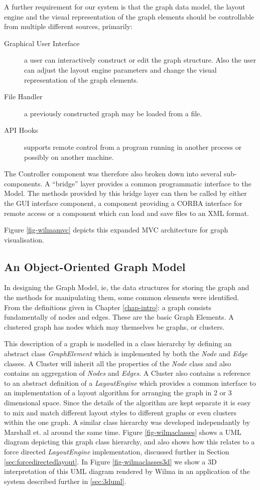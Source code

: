 \documentclass[runningheads]{cl2emult}
\begin{document}
A further requirement for our system is that the graph data model,
the layout engine and the visual representation of the graph elements should be controllable from multiple different sources, primarily:
\begin{description}
\item[Graphical User Interface] a user can interactively construct or edit the graph structure.  Also the user can adjust the layout engine parameters and change the visual representation of the graph elements.
\item[File Handler] a previously constructed graph may be loaded from a file.
\item[API Hooks] supports remote control from a program running in another process or possibly on
another machine. 
\end{description}
The Controller component was therefore also broken
down into several sub-components.  A ``bridge'' layer provides a common
programmatic interface to the Model.  The methods provided by this
bridge layer can then be called by either the GUI interface component,
a component providing a CORBA interface for remote access or a component which
can load and save files to an XML format.

Figure \ref{fig-wilmamvc} depicts this expanded MVC architecture for graph
visualisation. 

\subsection{An Object-Oriented Graph Model}
In designing the Graph Model, ie, the data structures for storing the
graph and the methods for manipulating them, some common
elements were identified.  From the definitions given in Chapter 
\ref{chap-intro}: a graph consists fundamentally
of nodes and edges.  These are the basic Graph Elements.  A clustered
graph has nodes which may themselves be graphs, or clusters.

This description of a graph is modelled in a class hierarchy by
defining an abstract class {\em GraphElement} which is implemented by
both the {\em Node} and {\em Edge} classes.  A {Cluster} will inherit
all the properties of the {\em Node} class and also contains an
aggregation of {\em Nodes} and {\em Edges}.  A {Cluster} also contains
a reference to an abstract definition of a {\em LayoutEngine} which
provides a common interface to an implementation of a layout algorithm
for arranging the graph in 2 or 3 dimensional space.  Since the
details of the algorithm are kept separate it is easy to mix and match
different layout styles to different graphs or even clusters within
the one graph.  A similar class hierarchy was developed independantly
by Marshall et.  al\cite{marshall00object} around the same time.
Figure \ref{fig-wilmaclasses} shows a UML diagram depicting this
graph class hierarchy, and also shows how this relates to a force
directed {\em LayoutEngine} implementation, discussed further in
Section \ref{sec:forcedirectedlayout}.  In Figure
\ref{fig-wilmaclasses3d} we show a 3D
interpretation of this UML diagram rendered by Wilma in an application
of the system described further in \ref{sec:3duml}.
\end{document}

